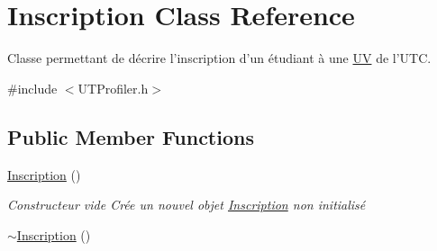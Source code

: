 \hypertarget{class_inscription}{\section{Inscription Class Reference}
\label{class_inscription}
}


Classe permettant de décrire l'inscription d'un étudiant à une \hyperlink{class_u_v}{U\-V} de l'U\-T\-C.  




{\ttfamily \#include $<$U\-T\-Profiler.\-h$>$}

\subsection*{Public Member Functions}
\begin{DoxyCompactItemize}
\item 
\hypertarget{class_inscription_a1eb6ac1e090dd05570321829e959d75f}{\hyperlink{class_inscription_a1eb6ac1e090dd05570321829e959d75f}{Inscription} ()}\label{class_inscription_a1eb6ac1e090dd05570321829e959d75f}

\begin{DoxyCompactList}\small\item\em Constructeur vide Crée un nouvel objet \hyperlink{class_inscription}{Inscription} non initialisé \end{DoxyCompactList}\item 
\hypertarget{class_inscription_abe0df05b5f2034ae418ae476f7db9ee7}{\hyperlink{class_inscription_abe0df05b5f2034ae418ae476f7db9ee7}{$\sim$\-Inscription} ()}\label{class_inscription_abe0df05b5f2034ae418ae476f7db9ee7}


\end{DoxyCompactItemize}
